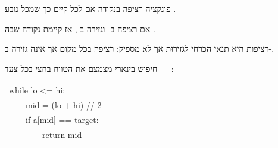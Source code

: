 \begin{defbox}
פונקציה  רציפה בנקודה  אם לכל  קיים 
כך שמכל  נובע .
\end{defbox}

\begin{thmbox}[frametitle={משפט הערך הממוצע}]
אם  רציפה ב-\en{$[a,b]$} וגזירה ב-, אז קיימת נקודה 
שבה .
\end{thmbox}

\begin{notebox}
רציפות היא תנאי הכרחי לגזירוּת אך לא מספיק:  רציפה בכל מקום אך אינה
גזירה ב-.
\end{notebox}

\begin{exbox}[frametitle={דוגמה — \code{binary\_search}}]
חיפוש בינארי מצמצם את הטווח בחצי בכל צעד — :\par\smallskip
\begin{otherlanguage}{english}\small\ttfamily
\begin{tabular}{@{}l@{}}
while lo <= hi:\\
\ \ \ \ mid = (lo + hi) // 2\\
\ \ \ \ if a[mid] == target:\\
\ \ \ \ \ \ \ \ return mid
\end{tabular}
\end{otherlanguage}
\end{exbox}

